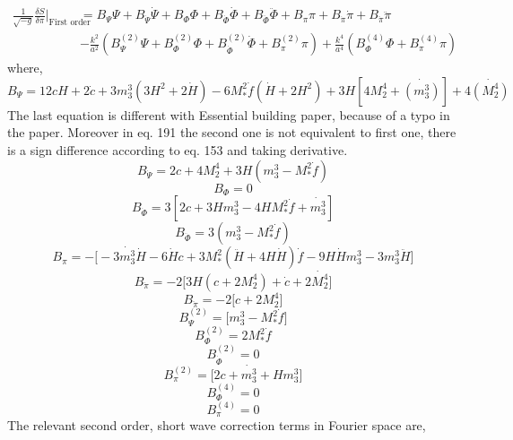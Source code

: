 \documentclass[a4paper,11pt]{article}
\def\be{\begin{equation}}
\def\ee{\end{equation}}
\begin{document}
\begin{align}
\frac{1}{\sqrt{-g}} \frac{\delta S}{\delta \pi}|_{\text{First order} }&=  B_{\Psi} \Psi+  B_{\dot{\Psi}} \dot{\Psi} +
B_{\Phi} \Phi + B_{\dot{\Phi}} \dot{\Phi}  + B_{\ddot{\Phi}} \ddot{\Phi}+B_{\pi} \pi +   B_{\dot{\pi}} \dot{\pi} + B_{\ddot{\pi}} \ddot{\pi}  
\nonumber  \\& 
- \frac{k^2}{a^2} \left( B^{(2)}_{\Psi}\Psi +  B^{(2)}_{\Phi}\Phi+ B^{(2)}_{\dot{\Phi}} \dot{\Phi} + B^{(2)}_{\pi}\pi \right) + \frac{k^4}{a^4} \left(B^{(4)}_{\Phi}\Phi +B^{(4)}_{\pi}\pi  \right)
\end{align}
where,
\be
B_{\Psi}=12 c H+2 \dot{c} +3 m_3^3 (3H^2+2\dot{H}) -6 M_*^2\dot{f} (\dot{H} + 2H^2) + 3H \left[ 4M_2^4 +\dot{(m_3^3)}\right]+4 \dot{(M_2^4)}
\ee
The last equation is different with Essential building paper, because of a typo in the paper. Moreover in eq. 191 the second one is not equivalent to first one, there is a sign difference according to eq. 153 and taking derivative.
\be
B_{\dot{\Psi}}=2c + 4 M_2^4 +3 H (m_3^3 -M_*^2 \dot{f})
\ee
\be
B_{\Phi}=0
\ee
\be
B_{\dot{\Phi}}=3 \left[ 2c +3 H m_3^3-4 H M_*^2 \dot{f} +\dot{m_3^3}\right]
\ee
\be
B_{\ddot{\Phi}}=3( m_3^3 -M_*^2 \dot{f})
\ee
\be
B_{{\pi}}=- \Big[ -3\dot{m_3^3} \dot{H} - 6 \dot{H} c + 3 M_*^2 (\ddot{H} +4 H \dot{H})\dot{f} - 9 H \dot{H} m_3^3- 3 m_3^3 \ddot{H}  \Big]
\ee
\be
B_{\dot{\pi}}=- 2\Big[ 3 H (c+ 2 M_2^4) +\dot{c} + 2\dot{M_2^4} \Big]
\ee
\be
B_{\ddot{\pi}}=- 2\Big[  c+ 2 M_2^4 \Big]
\ee
\be
B^{(2)}_{{\Psi}}= \Big[  m_3^3  - M_*^2 \dot{f}\Big]
\ee
\be
B^{(2)}_{{\Phi}}= 2  M_*^2 \dot{f} 
\ee
\be
B^{(2)}_{\dot{\Phi}}=
  0
\ee
\be
B^{(2)}_{{\pi}}=
 \Big[ 2c  + \dot{m_3^3}+ H m_3^3 \Big]
\ee
\be
B^{(4)}_{{\Phi}}=0
\ee
\be
B^{(4)}_{{\pi}}=
0
\ee
The relevant second order, short wave correction terms in Fourier space are,
\end{document}

